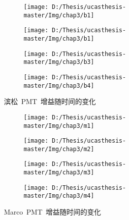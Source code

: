 \begin{figure}[!htbp]
  \centering
  \begin{subfigure}[b]{\MySubFactor\textwidth}
    \texttt{[image: D:/Thesis/ucasthesis-master/Img/chap3/b1]}
    \caption{}
    \label{fig:gainpmt1_1}
  \end{subfigure}%
  \quad\quad\quad\quad%
  \begin{subfigure}[b]{\MySubFactor\textwidth}
    \texttt{[image: D:/Thesis/ucasthesis-master/Img/chap3/b1]}
    \caption{}
    \label{fig:gainpmt1_2}
  \end{subfigure}
   \begin{subfigure}[b]{\MySubFactor\textwidth}
    \texttt{[image: D:/Thesis/ucasthesis-master/Img/chap3/b3]}
    \caption{}
    \label{fig:gainpmt1_3}
  \end{subfigure}%
  \quad\quad\quad\quad%
  \begin{subfigure}[b]{\MySubFactor\textwidth}
    \texttt{[image: D:/Thesis/ucasthesis-master/Img/chap3/b4]}
    \caption{}
    \label{fig:gainpmt1_4}
  \end{subfigure}
  \caption{滨松~PMT~增益随时间的变化}
  \label{fig:gainpmt1}
\end{figure}

\begin{figure}[!htbp]
  \centering
  \begin{subfigure}[b]{\MySubFactor\textwidth}
    \texttt{[image: D:/Thesis/ucasthesis-master/Img/chap3/m1]}
    \caption{}
    \label{fig:gainpmt2_1}
  \end{subfigure}%
  \quad\quad\quad\quad%
  \begin{subfigure}[b]{\MySubFactor\textwidth}
    \texttt{[image: D:/Thesis/ucasthesis-master/Img/chap3/m2]}
    \caption{}
    \label{fig:gainpmt2_2}
  \end{subfigure}
   \begin{subfigure}[b]{\MySubFactor\textwidth}
    \texttt{[image: D:/Thesis/ucasthesis-master/Img/chap3/m3]}
    \caption{}
    \label{fig:gainpmt2_3}
  \end{subfigure}%
  \quad\quad\quad\quad%
  \begin{subfigure}[b]{\MySubFactor\textwidth}
    \texttt{[image: D:/Thesis/ucasthesis-master/Img/chap3/m4]}
    \caption{}
    \label{fig:gainpmt2_4}
  \end{subfigure}
  \caption{Marco~PMT~增益随时间的变化}
  \label{fig:gainpmt2}
\end{figure}



